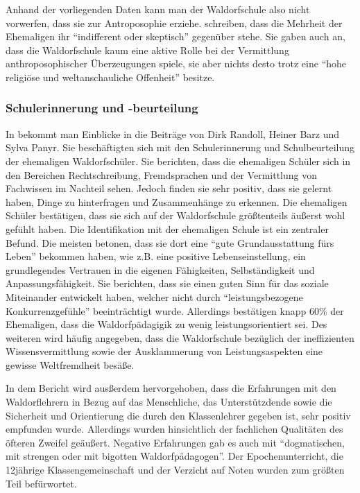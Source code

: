 Anhand der vorliegenden Daten kann man der Waldorfschule also nicht vorwerfen, dass sie zur Antroposophie erziehe. 
\citet[][S. 19]{randoll07} schreiben, dass die Mehrheit der Ehemaligen ihr \enquote{indifferent oder skeptisch} gegenüber stehe. 
Sie gaben auch an, dass die Waldorfschule kaum eine aktive Rolle bei der Vermittlung anthroposophischer Überzeugungen spiele, sie aber nichts desto trotz eine \enquote{hohe religiöse und weltanschauliche Offenheit} besitze.

\subsubsection{Schulerinnerung und -beurteilung}
\label{subsub:Erinnerung}

In \citet[][S. 19f]{randoll07} bekommt man Einblicke in die Beiträge von Dirk Randoll, Heiner Barz und Sylva Panyr. 
Sie beschäftigten sich mit den Schulerinnerung und Schulbeurteilung der ehemaligen Waldorfschüler. 
Sie berichten, dass die ehemaligen Schüler sich in den Bereichen Rechtschreibung, Fremdsprachen und der Vermittlung von Fachwissen im Nachteil sehen. 
Jedoch finden sie sehr positiv, dass sie gelernt haben, Dinge zu hinterfragen und Zusammenhänge zu erkennen. 
Die ehemaligen Schüler bestätigen, dass sie sich auf der Waldorfschule größtenteils äußerst wohl gefühlt haben. 
Die Identifikation mit der ehemaligen Schule ist ein zentraler Befund. 
Die meisten betonen, dass sie dort eine \enquote{gute Grundausstattung fürs Leben} bekommen haben, wie z.B. eine positive Lebenseinstellung, ein grundlegendes Vertrauen in die eigenen Fähigkeiten, Selbständigkeit und Anpassungsfähigkeit. 
Sie berichten, dass sie einen guten Sinn für das soziale Miteinander entwickelt haben, welcher nicht durch \enquote{leistungsbezogene Konkurrenzgefühle} beeinträchtigt wurde. 
Allerdings bestätigen knapp 60\% der Ehemaligen, dass die Waldorfpädagigik zu wenig leistungsorientiert sei. 
Des weiteren wird häufig angegeben, dass die Waldorfschule bezüglich der ineffizienten Wissensvermittlung sowie der Ausklammerung von Leistungsaspekten eine gewisse Weltfremdheit besäße. 

In dem Bericht wird ausßerdem hervorgehoben, dass die Erfahrungen mit den Waldorflehrern in Bezug auf das Menschliche, das Unterstützdende sowie die Sicherheit und Orientierung die durch den Klassenlehrer gegeben ist, sehr positiv empfunden wurde. 
Allerdings wurden hinsichtlich der fachlichen Qualitäten des öfteren Zweifel geäußert. 
Negative Erfahrungen gab es auch mit \enquote{dogmatischen, mit strengen oder mit bigotten Waldorfpädagogen}. 
Der Epochenunterricht, die 12jährige Klassengemeinschaft und der Verzicht auf Noten wurden zum größten Teil befürwortet. 














